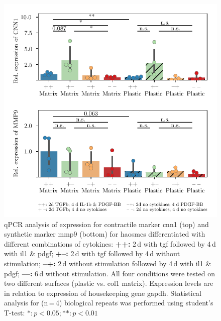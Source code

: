     \begin{figure}[h!]
    \capstart
        \centering
    	\includegraphics{Abbildung/qPCR.pdf}

    	\begin{minipage}{\captionwidth}
    		\caption[CNN_qPCR]{ \newline qPCR analysis of expression for contractile marker \ac{cnn1} (top) and synthetic marker \ac{mmp9} (bottom) for \acp{haosmc} differentiated with different combinations of cytokines:
            \textbf{++:} 2\,d with \ac{tgf} followed by 4\,d with \ac{il1} \& \ac{pdgf};
            \textbf{+–:} 2\,d with \ac{tgf} followed by 4\,d without stimulation;
            \textbf{–+:} 2\,d without stimulation followed by 4\,d with \ac{il1} \& \ac{pdgf};
            \textbf{––:} 6\,d without stimulation.
            All four conditions were tested on two different surfaces (plastic vs. \ac{col1} matrix). Expression levels are in relation to expression of housekeeping gene \ac{gapdh}. Statistical analysis for (n\,=\,4) biological repeats was performed using student's T-test: $*: p < 0.05; **: p < 0.01$}
    		\label{fig:qPCR_result}
    	\end{minipage}
    \end{figure}

